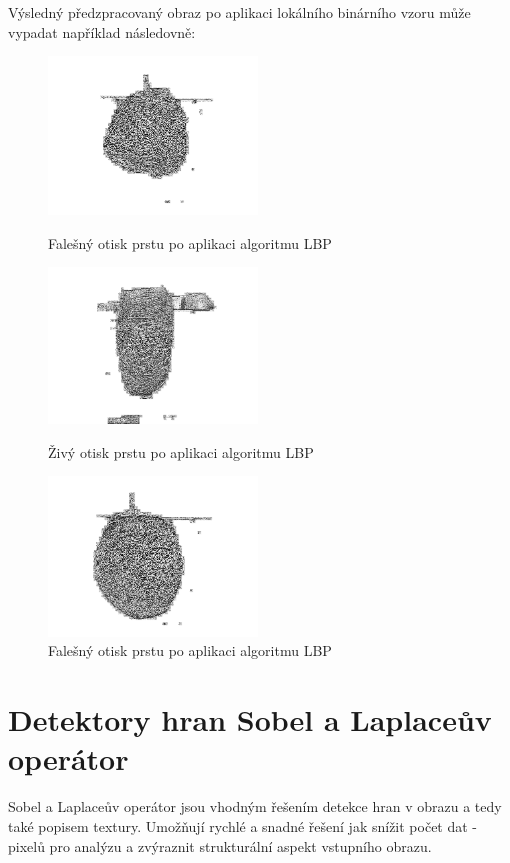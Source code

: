 Výsledný předzpracovaný obraz po aplikaci lokálního binárního vzoru může vypadat například následovně:
\begin{figure}[!htbp]
  \begin{minipage}[b]{0.3\linewidth}
    \centering
    \includegraphics[width=210px]{obrazky-figures/fake53otsulbp.png}
    \caption{Falešný otisk prstu po aplikaci algoritmu LBP}
  \end{minipage}
  \hspace{0.3cm}
  \begin{minipage}[b]{0.3\linewidth}
    \centering
    \includegraphics[width=210px]{obrazky-figures/Images29lbp.png}
    \caption{Živý otisk prstu po aplikaci algoritmu LBP}
  \end{minipage}
  \hspace{0.3cm}
    \begin{minipage}[b]{0.3\linewidth}
    \centering
    \includegraphics[width=210px]{obrazky-figures/fake44otsulbp.png}
    \caption{Falešný otisk prstu po aplikaci algoritmu LBP}
  \end{minipage}
\end{figure}

\section{Detektory hran Sobel a Laplaceův operátor}
Sobel a Laplaceův operátor jsou vhodným řešením detekce hran v obrazu a tedy také popisem textury. Umožňují rychlé a snadné řešení jak snížit počet dat - pixelů pro analýzu a zvýraznit strukturální aspekt vstupního obrazu. 

